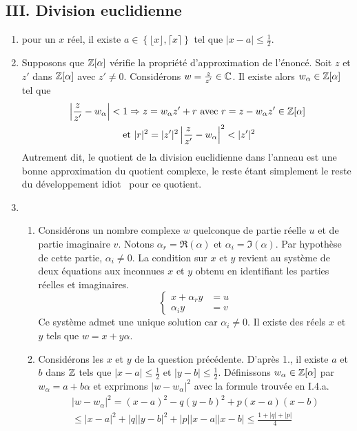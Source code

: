 \subsection*{III. Division euclidienne}
\begin{enumerate}
  \item pour un $x$ réel, il existe $a\in\left\lbrace \lfloor x \rfloor , \lceil x \rceil \right\rbrace$ tel que $|x-a|\leq \frac{1}{2}$.  
  
  \item Supposons que $\mathbb{Z}[\alpha]$ vérifie la propriété d'approximation de l'énoncé. Soit $z$ et $z'$ dans $\mathbb{Z}[\alpha]$ avec $z'\neq 0$. Considérons $w = \frac{z}{z'}\in\mathbb{C}$. Il existe alors $w_{\alpha}\in \mathbb{Z}[\alpha]$ tel que 
  \begin{multline*}
    \left|\frac{z}{z'}-w_{\alpha}\right| < 1 \Rightarrow z = w_{\alpha}z' + r \text{ avec } r = z-w_{\alpha}z' \in \mathbb{Z}[\alpha] \\
    \text{ et } |r|^2 = |z'|^2 \left|\frac{z}{z'}-w_{\alpha}\right|^2 < |z'|^2
  \end{multline*}
Autrement dit, le quotient de la division euclidienne dans l'anneau est une bonne approximation du quotient complexe, le reste étant simplement le reste du \og développement idiot\fg~ pour ce quotient. 
  
  \item
  \begin{enumerate}
    \item Considérons un nombre complexe $w$ quelconque de partie réelle $u$ et de partie imaginaire $v$. Notons $\alpha_r = \Re(\alpha)$ et $\alpha_i = \Im(\alpha)$. Par hypothèse de cette partie, $\alpha_i\neq 0$. La condition sur $x$ et $y$ revient au système de deux équations aux inconnues $x$ et $y$ obtenu en identifiant les parties réelles et imaginaires.
\begin{displaymath}
  \left\lbrace 
  \begin{aligned}
    x + \alpha_r y &= u \\ \alpha_i y &= v
  \end{aligned}
  \right. 
\end{displaymath}
Ce système admet une unique solution car $\alpha_i \neq 0$. Il existe des réels $x$ et $y$ tels que $w = x +y \alpha$.    
    
    \item Considérons les $x$ et $y$ de la question précédente. D'après 1., il existe $a$ et $b$ dans $\mathbb{Z}$ tels que $|x-a| \leq \frac{1}{2}$ et $|y-b| \leq \frac{1}{2}$. Définissons $w_{\alpha}\in \mathbb{Z}[\alpha]$ par $w_{\alpha} = a+b\alpha$ et exprimons $|w-w_{\alpha}|^2$ avec la formule trouvée en I.4.a. 
\begin{multline*}
  |w-w_{\alpha}|^2 = (x-a)^2 - q(y-b)^2 + p(x-a)(x-b) \\
  \leq |x-a|^2 + |q||y-b|^2 + |p||x-a||x-b| \leq \frac{1 + |q| + |p|}{4}
\end{multline*}


\end{enumerate}
\end{enumerate}
